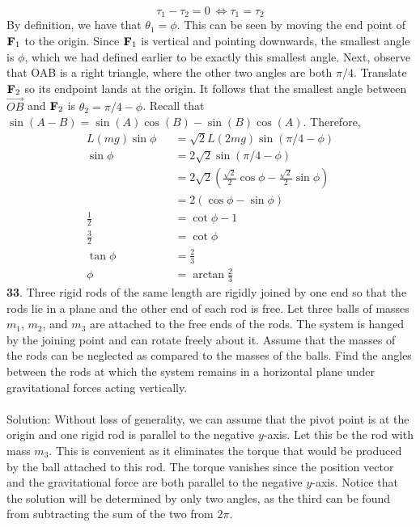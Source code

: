 \documentclass[12pt]{amsbook}
\begin{document}
$$\tau_1-\tau_2=0 \ \Leftrightarrow \tau_1=\tau_2$$
By definition, we have that $\theta_1=\phi$. This can be seen by moving the end point of ${\bf F}_1$ to the origin. Since ${\bf F}_1$ is vertical and pointing downwards, the smallest angle is $\phi$, which we had defined earlier to be exactly this smallest angle. Next, observe that OAB is a right triangle, where the other two angles are both $\pi/4$. Translate ${\bf F}_2$ so its endpoint lands at the origin. It follows that the smallest angle between $\overrightarrow{OB}$ and ${\bf F}_2$ is $\theta_2=\pi/4-\phi$. Recall that $\sin(A-B)=\sin(A)\cos(B)-\sin(B)\cos(A)$. Therefore,
\begin{eqnarray*}
L(mg)\sin\phi&&=\sqrt{2}L(2mg)\sin(\pi/4-\phi) \\
\sin\phi&&=2\sqrt{2}\sin(\pi/4-\phi) \\
&&=2\sqrt{2}(\frac{\sqrt{2}}{2}\cos\phi-\frac{\sqrt{2}}{2}\sin\phi) \\
&&=2(\cos\phi-\sin\phi) \\
\frac{1}{2}&&=\cot\phi-1 \\
\frac{3}{2}&&=\cot\phi \\
\tan\phi&&=\frac{2}{3}\\
\phi&&=\arctan{\frac{2}{3}}
\end{eqnarray*}
{\small\bf 33}. Three rigid rods of the same length
are rigidly joined by one end so that the rods lie
in a plane and the other end of each rod is free. Let  
three balls of masses $m_1$, $m_2$, 
and $m_3$  are
attached to the free ends of the rods.
The system
is hanged by the joining point and can rotate freely
about it.
Assume that the masses of the rods  
can be neglected as compared to the 
masses of the balls. Find the angles between the 
rods at which the system remains in a horizontal plane
under gravitational forces acting vertically. 
\\
\\
{\sc Solution}: Without loss of generality, we can assume that the pivot point is at the origin and one rigid rod is parallel to the negative $y$-axis. Let this be the rod with mass $m_3$. This is convenient as it eliminates the torque that would be produced by the ball attached to this rod. The torque vanishes since the position vector and the gravitational force are both parallel to the negative $y$-axis. Notice that the solution will be determined by only two angles, as the third can be found from subtracting the sum of the two from $2\pi$. 

\enlargethispage{5 mm}
\end{document}
